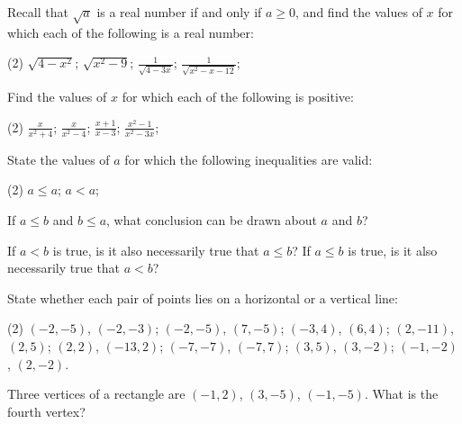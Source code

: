 \begin{questions}
\begin{note}
  \end{note}
  \item Recall that $\sqrt{a}$ is a real number if and only if $a \geq 0$, and find the values of $x$ for which each of the following is a real number:
  \begin{tasks}(2)
    \task $\sqrt{4-x^2}$;
    \task $\sqrt{x^2-9}$;
    \task \(\frac{1}{\sqrt{4-3x}}\);
    \task \(\frac{1}{\sqrt{x^2-x-12}}\);
  \end{tasks}
  \item Find the values of $x$ for which each of the following is positive:
  \begin{tasks}(2)
    \task \(\frac{x}{x^2+4}\);
    \task \(\frac{x}{x^2-4}\);
    \task \(\frac{x+1}{x-3}\);
    \task \(\frac{x^2-1}{x^2-3x}\);
  \end{tasks}
  \item State the values of $a$ for which the following inequalities are valid:
  \begin{tasks}(2)
    \task $a \leq a$;
    \task $a<a$;
  \end{tasks}
  \item If $a \leq b$ and $b \leq a$, what conclusion can be drawn about $a$ and $b$?
  \item \begin{tasks}
    \task If $a<b$ is true, is it also necessarily true that $a \leq b$?
    \task If $a \leq b$ is true, is it also necessarily true that $a<b$?
  \end{tasks}
  \item State whether each pair of points lies on a horizontal or a vertical line:
  \begin{tasks}(2)
    \task $(-2, -5)$, $(-2, -3)$;
    \task $(-2, -5)$, $(7, -5)$;
    \task $(-3, 4)$, $(6, 4)$;
    \task $(2, -11)$, $(2, 5)$;
    \task $(2, 2)$, $(-13, 2)$;
    \task $(-7, -7)$, $(-7, 7)$;
    \task $(3, 5)$, $(3, -2)$;
    \task $(-1, -2)$, $(2, -2)$.
  \end{tasks}
  \item Three vertices of a rectangle are $(-1, 2)$, $(3, -5)$, $(-1, -5)$. What is the fourth vertex?
\end{questions}